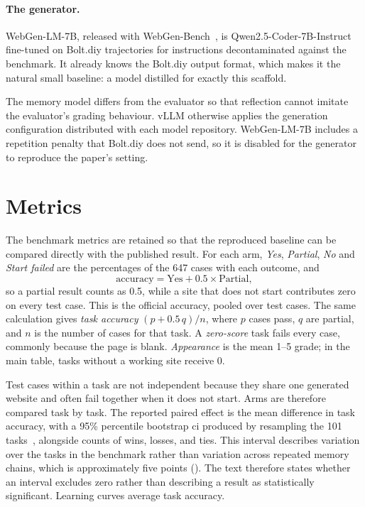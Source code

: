\paragraph{The generator.} WebGen-LM-7B, released with WebGen-Bench~\cite{lu2025webgenbench}, is Qwen2.5-Coder-7B-Instruct~\cite{hui2024qwencoder} fine-tuned on Bolt.diy trajectories for instructions decontaminated against the benchmark. It already knows the Bolt.diy output format, which makes it the natural small baseline: a model distilled for exactly this scaffold.

The memory model differs from the evaluator so that reflection cannot imitate the evaluator's grading behaviour. vLLM otherwise applies the generation configuration distributed with each model repository. WebGen-LM-7B includes a repetition penalty that Bolt.diy does not send, so it is disabled for the generator to reproduce the paper's setting.

\section{Metrics}
\label{sec:metrics}
The benchmark metrics are retained so that the reproduced baseline can be compared directly with the published result. For each arm, \emph{Yes}, \emph{Partial}, \emph{No} and \emph{Start failed} are the percentages of the 647 cases with each outcome, and
\begin{equation}
\text{accuracy} = \text{Yes} + 0.5 \times \text{Partial},
\end{equation}
so a partial result counts as 0.5, while a site that does not start contributes zero on every test case. This is the official accuracy, pooled over test cases. The same calculation gives \emph{task accuracy} $(p + 0.5\,q)/n$, where $p$ cases pass, $q$ are partial, and $n$ is the number of cases for that task. A \emph{zero-score} task fails every case, commonly because the page is blank. \emph{Appearance} is the mean 1--5 grade; in the main table, tasks without a working site receive 0.

Test cases within a task are not independent because they share one generated website and often fail together when it does not start. Arms are therefore compared task by task. The reported paired effect is the mean difference in task accuracy, with a 95\% percentile bootstrap \gls{ci} produced by resampling the 101 tasks~\cite{efron1993bootstrap}, alongside counts of wins, losses, and ties. This interval describes variation over the tasks in the benchmark rather than variation across repeated memory chains, which is approximately five points (). The text therefore states whether an interval excludes zero rather than describing a result as statistically significant. Learning curves average task accuracy.

